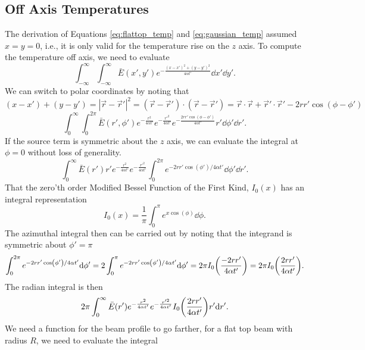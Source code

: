 \documentclass[]{article}
\begin{document}
\subsection{Off Axis Temperatures}
The derivation of Equations \ref{eq:flattop_temp} and \ref{eq:gaussian_temp} assumed $x = y = 0$, i.e., it is only valid for the temperature rise on the $z$ axis.
To compute the temperature off axis, we need to evaluate 
\begin{equation*}
  \int_{-\infty}^\infty \int_{-\infty}^\infty \bar{E}(x',y') e^{-\frac{(x-x')^2 + (y-y')^2}{4\alpha t'}} \dd x' \dd y'.
\end{equation*}
We can switch to polar coordinates by noting that $(x-x') + (y-y') = |\vec{r}-\vec{r}'|^2 = (\vec{r}-\vec{r}')\cdot(\vec{r}-\vec{r}') = \vec{r}\cdot\vec{r} + \vec{r}'\cdot\vec{r}' - 2r r' \cos(\phi - \phi')$
\begin{equation*}
  \int_0^\infty \int_0^{2\pi} \bar{E}(r',\phi')  e^{-\frac{r^2}{4\alpha t'}}e^{-\frac{r'^2}{4\alpha t'}}e^{-\frac{2rr'\cos(\phi-\phi')}{4\alpha t'}}r' \dd \phi' \dd r'.
\end{equation*}
If the source term is symmetric about the $z$ axis, we can evaluate the integral at $\phi=0$ without loss of generality.
\begin{equation*}
\int_0^\infty \bar{E}(r') r'e^{-\frac{r^2}{4\alpha t'}}e^{-\frac{r'^2}{4\alpha t'}}\int_0^{2\pi} e^{-2rr'\cos(\phi')/4\alpha t'} \dd \phi' \dd r'.
\end{equation*}
That the zero'th order Modified Bessel Function of the First Kind, $I_0(x)$ has an integral representation
\begin{equation}
  I_0(x) = \frac{1}{\pi} \int_0^\pi e^{x\cos(\phi)} \dd \phi.
\end{equation}
The azimuthal integral then can be carried out by noting that the integrand is symmetric about $\phi' = \pi$
\begin{equation*}
\int_0^{2\pi}  e^{-2rr'\cos(\phi')/4\alpha t'}\dd \phi'
=2\int_0^{\pi}  e^{-2rr'\cos(\phi')/4\alpha t'}\dd \phi'
=2\pi I_0\qty(\frac{-2rr'}{4\alpha t'})
=2\pi I_0\qty(\frac{2rr'}{4\alpha t'}).
\end{equation*}
The radian integral is then
\begin{equation*}
  2\pi \int_0^\infty \bar{E}(r')   e^{-\frac{r^2}{4\alpha t'}}e^{-\frac{r'^2}{4\alpha t'}}I_0\qty(\frac{2rr'}{4\alpha t'}) r'\dd r'.
\end{equation*}
We need a function for the beam profile to go farther, for a flat top beam with radius $R$,
we need to evaluate the integral
\end{document}
